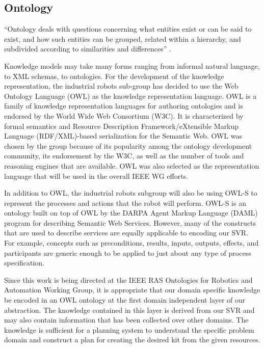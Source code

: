 \subsection{Ontology}
\label{subsect:Ontology}
``Ontology deals with questions concerning what entities exist or can be said to exist, and how such entities can be grouped, related within a hierarchy, and subdivided according to similarities and differences'' \cite{ontologyDef}.

Knowledge models may take many forms ranging from informal natural language, to XML schemas, to ontologies.
For the development of the  knowledge representation, the industrial robots sub-group has decided to use the  Web Ontology Language (OWL) \cite{OWL} as the knowledge representation language. OWL is a family of knowledge representation languages for authoring ontologies and is endorsed by the World Wide Web Consortium (W3C). It is characterized by formal semantics and Resource Description Framework/eXtensible Markup Language (RDF/XML)-based serialization for the Semantic Web. OWL was chosen by the group because of its popularity among the ontology development community, its endorsement by the W3C, as well as the number of tools and reasoning engines that are available. OWL was also selected as the representation language that will be used in the overall IEEE WG efforts.

In addition to OWL, the industrial robots subgroup will also be using OWL-S \cite{Martin2012} to represent the processes and actions that the robot will perform. OWL-S is an ontology built on top of OWL by the DARPA Agent Markup Language (DAML) program \cite{damlWeb}
for describing Semantic Web Services. However, many of the constructs that are used to describe services are equally applicable to encoding our SVR. For example, concepts such as preconditions, results, inputs, outputs, effects, and participants are generic enough to be applied to just about any type of process specification.

Since this work is being directed at the IEEE RAS Ontologies for Robotics and Automation Working Group, it is appropriate that our  domain specific knowledge  be
encoded in an OWL ontology at the first domain independent  layer of our abstraction. The knowledge contained in this layer is derived from our SVR and may also contain
information that has been collected over other domains. The knowledge is sufficient for a planning system to understand the specific problem domain and construct
a plan for creating the desired kit from the given resources.

